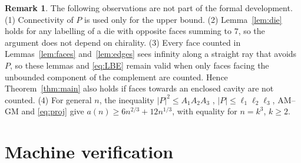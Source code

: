 \documentclass[11pt]{amsart}
\theoremstyle{plain}
\theoremstyle{definition}
\newtheorem{remark}[theorem]{Remark}
\begin{document}
\begin{remark}\label{rem:extra}
The following observations are not part of the formal development.
(1) Connectivity of $P$ is used only for the upper bound.
(2) Lemma~\ref{lem:die} holds for any labelling of a die with opposite faces summing to $7$, so the argument does not depend on chirality.
(3) Every face counted in Lemmas~\ref{lem:faces} and~\ref{lem:edges} sees infinity along a straight ray that avoids $P$, so these lemmas and \eqref{eq:LBE} remain valid when only faces facing the unbounded component of the complement are counted. Hence Theorem~\ref{thm:main} also holds if faces towards an enclosed cavity are not counted.
(4) For general $n$, the inequality $|P|^2\le A_1A_2A_3$ \cite{LW}, $|P|\le\ell_1\ell_2\ell_3$, AM--GM and \eqref{eq:proj} give $a(n)\ge6n^{2/3}+12n^{1/3}$, with equality for $n=k^3$, $k\ge2$.
\end{remark}

\section{Machine verification}\label{sec:lean}
\end{document}
